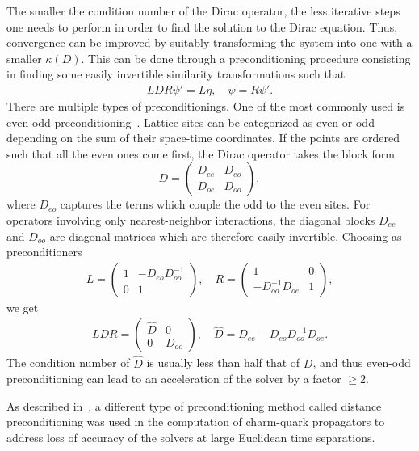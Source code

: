 The smaller the condition number of the Dirac operator, the less iterative steps one needs to perform in order to find the solution to the Dirac equation. Thus, convergence can be improved by suitably transforming the system into one with a smaller $\kappa(D)$. This can be done through a preconditioning procedure consisting in  finding some easily invertible similarity transformations such that 
\begin{gather}
LDR\psi'=L\eta, \quad \psi=R\psi'.
\end{gather}
There are multiple types of preconditionings. One of the most commonly used is even-odd preconditioning~\citep{DEGRAND1988161}. Lattice sites can be categorized as even or odd depending on the sum of their space-time coordinates. If the points are ordered such that all the even ones come first, the Dirac operator takes the block form
\begin{equation}
D=\begin{pmatrix}
D_{ee} & D_{eo} \\ 
D_{oe} & D_{oo}
\end{pmatrix},
\end{equation}
where $D_{eo}$ captures the terms which couple the odd to the even sites. For operators involving only nearest-neighbor interactions, the diagonal blocks $D_{ee}$ and $D_{oo}$ are diagonal matrices which are therefore easily invertible. Choosing as preconditioners
\begin{gather}
L=\begin{pmatrix}
1 & -D_{eo}D_{oo}^{-1} \\ 
0 & 1
\end{pmatrix}, \quad 
R=\begin{pmatrix}
1 & 0 \\ 
-D_{oo}^{-1}D_{oe} &  1
\end{pmatrix},
\end{gather}
we get
\begin{gather}
LDR=\begin{pmatrix}
\hat{D} & 0 \\ 
0 & D_{oo}
\end{pmatrix}, \quad
\hat{D}=D_{ee}-D_{eo}D_{oo}^{-1}D_{oe}.
\end{gather}
The condition number of $\hat{D}$ is usually less than half that of $D$, and thus even-odd preconditioning can lead to an acceleration of the solver by a factor $\geq2$.

As described in~\citep{deDivitiis:2010ya}, a different type of preconditioning method called distance preconditioning was used in the computation of charm-quark propagators to address  loss of  accuracy of the solvers at large Euclidean time separations. 




